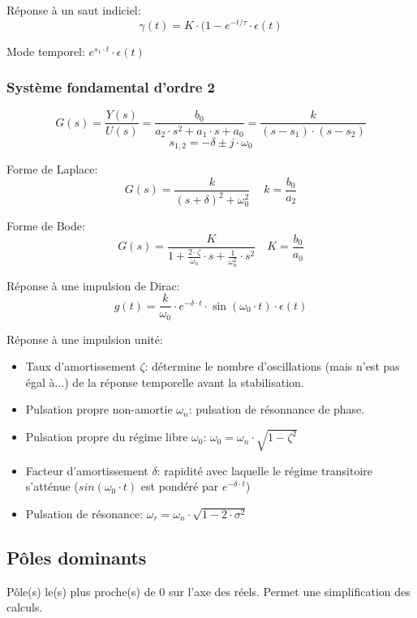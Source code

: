 \documentclass[10pt, twocolumn]{article}
\begin{document}
				Réponse à un saut indiciel:
				\[\gamma(t) = K \cdot (1-e^{-t/\tau} \cdot \epsilon (t)\]
				
				Mode temporel: $e^{s_1 \cdot t} \cdot \epsilon (t)$
				
			\subsubsection*{Système fondamental d'ordre 2}
				
				\[G(s)=\frac{Y(s)}{U(s)} =\frac{b_{0}}{a_{2} \cdot s^{2}+a_{1} \cdot s+a_{0}}=\frac{k}{(s-s_{1}) \cdot(s-s_{2})}\]
				\[s_{1,2}=-\delta \pm j \cdot \omega_{0}\]
				
				Forme de Laplace:
				\[G(s) = \frac{k}{(s+\delta)^{2}+\omega_{0}^{2}}\ \quad k=\frac{b_0}{a_2}\]
				
				Forme de Bode:
				\[G(s)=\frac{K}{1+\frac{2 \cdot \zeta}{\omega_{n}} \cdot s+\frac{1}{\omega_{n}^{2}} \cdot s^{2}} \quad K = \frac{b_0}{a_0}\]
				
				Réponse à une impulsion de Dirac:
				\[g(t)=\frac{k}{\omega_{0}} \cdot e^{-\delta \cdot t} \cdot \sin \left(\omega_{0} \cdot t\right) \cdot \epsilon(t)\]
				
				Réponse à une impulsion unité:
				
				\begin{itemize}
					\item Taux d'amortissement $\zeta$: détermine le nombre d'oscillations (mais n'est pas égal à...) de la réponse temporelle avant la stabilisation.
					\item Pulsation propre non-amortie $\omega _n$: pulsation de résonnance de phase.
					\item Pulsation propre du régime libre $\omega _0$: $\omega _0 = \omega _n \cdot \sqrt{1-\zeta ^2}$
					\item Facteur d'amortissement $\delta$: rapidité avec laquelle le régime transitoire s'atténue ($sin (\omega _0 \cdot t)$ est pondéré par $e^{-\delta \cdot t}$)
					\item Pulsation de résonance: $\omega _r = \omega _n \cdot \sqrt{1-2\cdot\sigma^2}$
				\end{itemize}
				
				
		\subsection*{Pôles dominants}
			
			Pôle(s) le(s) plus proche(s) de 0 sur l'axe des réels. Permet une simplification des calculs.
			
\end{document}
